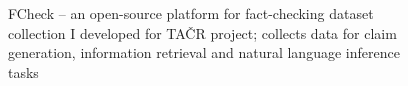 \begin{figure}
    \caption{{\techbf FCheck} -- an open-source platform for fact-checking dataset collection I developed for TAČR project; collects data for claim generation, information retrieval and natural language inference tasks}
    \label{fig:fcheck}
\end{figure}

